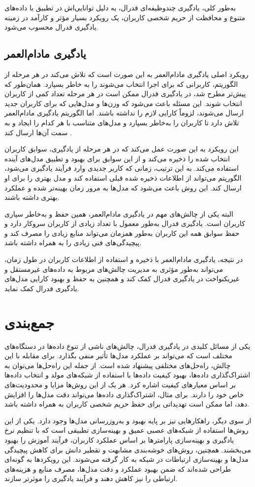به‌طور کلی، یادگیری چندوظیفه‌ای فدرال، به دلیل توانایی‌اش در تطبیق با داده‌های متنوع و محافظت از حریم شخصی کاربران، یک رویکرد بسیار مؤثر و کارآمد در زمینه یادگیری فدرال محسوب می‌شود.


\subsection{
	یادگیری مادام‌العمر%
}
رویکرد اصلی یادگیری مادام‌العمر به این صورت است که تلاش می‌کند در هر مرحله از الگوریتم، کاربرانی که برای اجرا انتخاب می‌شوند را به خاطر بسپارد. همان‌طور که پیش‌تر مطرح شد، در یادگیری فدرال ممکن است در هر مرحله تعداد کمی از کاربران انتخاب شوند. این مسئله باعث می‌شود که وزن‌ها و مدل‌هایی که برای کاربران جدید ارسال می‌شوند، لزوماً کارایی لازم را نداشته باشند. اما الگوریتم یادگیری مادام‌العمر تلاش دارد تا کاربران را به‌خاطر بسپارد و مدل‌های متناسب با هر کدام را ایجاد و به سمت آن‌ها ارسال کند
\cite{shoham2019overcoming}.

این رویکرد به این صورت عمل می‌کند که در هر مرحله از یادگیری، سوابق کاربران انتخاب شده را ذخیره می‌کند و از این سوابق برای بهبود و تطبیق مدل‌های آینده استفاده می‌کند. به این ترتیب، زمانی که کاربر جدیدی وارد فرآیند یادگیری می‌شود، الگوریتم می‌تواند از اطلاعات ذخیره شده قبلی استفاده کند و مدل بهتری را برای او ارسال کند. این روش باعث می‌شود که مدل‌ها به مرور زمان بهینه‌تر شده و عملکرد بهتری داشته باشند.

البته یکی از چالش‌های مهم در یادگیری مادام‌العمر، همین حفظ و به‌خاطر سپاری کاربران است. یادگیری فدرال به‌طور معمول با تعداد زیادی از کاربران سروکار دارد و حفظ سوابق همه این کاربران به‌طور همزمان می‌تواند منابع زیادی را مصرف کند و پیچیدگی‌های فنی زیادی را به همراه داشته باشد.

در نتیجه، یادگیری مادام‌العمر با ذخیره و استفاده از اطلاعات کاربران در طول زمان، می‌تواند به‌طور مؤثری به مدیریت چالش‌های مربوط به داده‌های غیرمستقل و غیریکنواخت در یادگیری فدرال کمک کند و همچنین به حفظ و بهبود کارایی مدل‌های یادگیری فدرال کمک نماید.


\section{جمع‌بندی}
یکی از مسائل کلیدی در یادگیری فدرال، چالش‌های ناشی از تنوع داده‌ها در دستگاه‌های مختلف است که می‌تواند بر عملکرد مدل‌ها تأثیر منفی بگذارد. برای مقابله با این چالش، راه‌حل‌های مختلفی پیشنهاد شده است. از جمله این راه‌حل‌ها می‌توان به اشتراک‌گذاری داده‌ها، بهبود کیفیت داده‌ها با استفاده از شبکه‌های مولد و انتخاب داده‌ها بر اساس معیارهای کیفیت اشاره کرد. هر یک از این روش‌ها مزایا و محدودیت‌های خاص خود را دارند. برای مثال، اشتراک‌گذاری داده‌ها می‌تواند دقت مدل‌ها را افزایش دهد، اما ممکن است تهدیداتی برای حفظ حریم شخصی کاربران به همراه داشته باشد.

از سوی دیگر، راهکارهایی نیز بر پایه بهبود و به‌روزرسانی مدل‌ها وجود دارد. یکی از این روش‌ها استفاده از شبکه‌های عصبی عمیق و بهینه‌سازی تطبیقی است که با تنظیم نرخ یادگیری و بهینه‌سازی پارامترها بر اساس عملکرد کاربران، فرآیند آموزش را بهبود می‌بخشند. همچنین، روش‌های خوشه‌بندی مشابهت و تقطیر دانش برای کاهش پیچیدگی مدل‌ها و بهینه‌سازی ارتباطات در شبکه به کار گرفته می‌شوند. این رویکردها به گونه‌ای طراحی شده‌اند که ضمن بهبود عملکرد و دقت مدل‌ها، مصرف منابع و هزینه‌های ارتباطی را نیز کاهش دهند و فرآیند یادگیری را موثرتر سازند.

